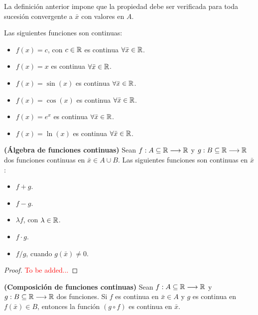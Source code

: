 \begin{nota}
	La definición anterior impone que la propiedad debe ser verificada para toda sucesión convergente a $\bar{x}$ con valores en $A$. 
\end{nota}

\begin{ejemplo}
	Las siguientes funciones son continuas: 
	
	\begin{itemize}
		\item $f(x) = c$, con $c \in \mathbb{R}$ es continua $\forall \bar{x} \in \mathbb{R}$. 
		\item $f(x) = x$ es continua $\forall \bar{x} \in \mathbb{R}$.
		\item $f(x) = \sin(x)$ es continua $\forall \bar{x} \in \mathbb{R}$.
		\item $f(x) = \cos(x)$ es continua $\forall \bar{x} \in \mathbb{R}$.
		\item $f(x) = e^x$ es continua $\forall \bar{x} \in \mathbb{R}$.
		\item $f(x) = \ln(x)$ es continua $\forall \bar{x} \in \mathbb{R}$.
	\end{itemize}
\end{ejemplo}

\begin{proposicion}
	\textbf{(Álgebra de funciones continuas)} 
	Sean $f: A \subseteq \mathbb{R} \longrightarrow \mathbb{R}$ y $g: B\subseteq \mathbb{R} \longrightarrow \mathbb{R}$ dos funciones continuas en $\bar{x} \in A \cup B$. Las siguientes funciones son continuas en $\bar{x}$: 
	\begin{itemize}
		\item $f + g$. 
		\item $f - g$. 
		\item $\lambda f$, con $\lambda \in \mathbb{R}$. 
		\item $f\cdot g$. 
		\item $f/g$, cuando $g(\bar{x})\neq 0$. 
	\end{itemize}
\end{proposicion}

\begin{proof}
	\textcolor{red}{To be added...}
\end{proof}

\begin{teorema}
	\textbf{(Composición de funciones continuas)}
	Sean $f: A \subseteq \mathbb{R} \longrightarrow \mathbb{R}$ y $g: B\subseteq \mathbb{R} \longrightarrow \mathbb{R}$ dos funciones. Si $f$ es continua en $\bar{x} \in A$ y $g$ es continua en $f(\bar{x}) \in B$, entonces la función $(g \circ f)$ es continua en $\bar{x}$. 
\end{teorema}

